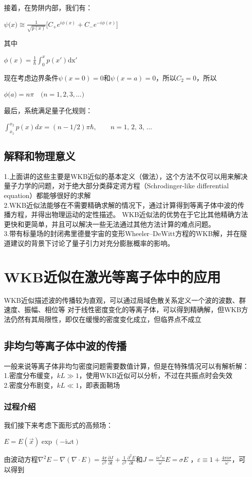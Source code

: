 \documentclass[12pt, a4paper, oneside]{ctexart}
\begin{document}
\begin{spacing}{2.0}
接着，在势阱内部，我们有：
\begin{center}
    $\displaystyle\psi\big(x\big)\cong\frac{1}{\sqrt{p(x)}}\biggl[C_+e^{i\phi(x)}+C_-e^{-i\phi(x)}\biggr]$
\end{center}
其中
\begin{center}
    $\displaystyle \phi(x) = \frac{1}{\hbar}\int_0^xp(x')\mathrm{dx'}$
\end{center}
现在考虑边界条件$\psi(x=0)=0$和$\psi(x=a)=0$，所以$C_2=0$，所以
\begin{center}
    $\phi\bigl(a\bigr)=n\pi\quad\bigl(n=1,2,3,...\bigr)$
\end{center}
最后，系统满足量子化规则：
\begin{center}
    $\displaystyle \int_{x_1}^{x_2} p(x)dx =(n - 1/2)\pi\hbar,\qquad n=1,\,2,\,3,\,\dots\,\!$
\end{center}

\subsection{解释和物理意义}
1.上面讲的这些主要是WKB近似的基本定义（做法），这个方法不仅可以用来解决量子力学的问题，对于绝大部分类薛定谔方程（Schrodinger-like differential equation）都能够很好的求解\\
2.WKB近似法能够在不需要精确求解的情况下，通过计算得到等离子体中波的传播方程，并得出物理运动的定性描述。
WKB近似法的优势在于它比其他精确方法更快和更简单，并且可以解决一些无法通过其他方法计算的难点问题。
\\
3.带有标量场的封闭弗里德曼宇宙的变形Wheeler–DeWitt方程的WKB解，并在隧道建议的背景下讨论了量子引力对充分膨胀概率的影响。\cite{LU2018502}

\section{WKB近似在激光等离子体中的应用}
WKB近似描述波的传播较为直观，可以通过局域色散关系定义一个波的波数、群速度、振幅、相位等
对于线性密度变化的等离子体，可以得到精确解，但WKB方法仍然有其局限性，即仅在缓慢的密度变化成立，但临界点不成立
\subsection{非均匀等离子体中波的传播}
一般来说等离子体非均匀密度问题需要数值计算，但是在特殊情况可以有解析解：
1.密度分布缓变，$kL\gg 1$，使用WKB近似可以分析，不过在共振点时会失效\cite{lasertextbook11223}
\\
2.密度分布剧变，$kL\ll 1$，即表面鞘场
\subsubsection{过程介绍}
我们接下来考虑下面形式的高频场：
\begin{center}
    $\displaystyle E = E(\vec{x})\exp (-\mathrm{i\omega t})$
\end{center}
由波动方程$\displaystyle \nabla^{2}E-\nabla(\nabla\cdot E)=\frac{4\pi}{c^{2}}\frac{\partial J}{\partial t}+\frac{1}{c^{2}}\frac{\partial^{2}E}{\partial t}$和$\displaystyle J = \frac{ie^2n}{\omega}E = \sigma E$
，$\displaystyle \varepsilon\equiv 1+\frac{4\pi i \sigma}{\omega}$，可以得到


\end{spacing}
\end{document}
